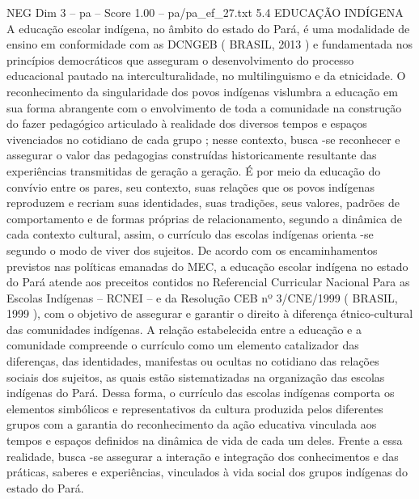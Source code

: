 \begin{textsample}{NEG Dim 3 – pa – Score 1.00 – pa/pa\_ef\_27.txt}  \label{ex:f3_neg_057}
5.4 EDUCAÇÃO INDÍGENA A educação escolar indígena, no âmbito do estado do Pará, é uma modalidade de ensino em conformidade com as DCNGEB ( BRASIL, 2013 ) e fundamentada nos princípios democráticos que asseguram o desenvolvimento do processo educacional pautado na interculturalidade, no multilinguismo e da etnicidade.
O reconhecimento da singularidade dos povos indígenas vislumbra a educação em sua forma abrangente com o envolvimento de toda a comunidade na construção do fazer pedagógico articulado à realidade dos diversos tempos e espaços vivenciados no cotidiano de cada grupo ; nesse contexto, busca -se reconhecer e assegurar o valor das pedagogias construídas historicamente resultante das experiências transmitidas de geração a geração.
É por meio da educação do convívio entre os pares, seu contexto, suas relações que os povos indígenas reproduzem e recriam suas identidades, suas tradições, seus valores, padrões de comportamento e de formas próprias de relacionamento, segundo a dinâmica de cada contexto cultural, assim, o currículo das escolas indígenas orienta -se segundo o modo de viver dos sujeitos.
De acordo com os encaminhamentos previstos nas políticas emanadas do MEC, a educação escolar indígena no estado do Pará atende aos preceitos contidos no Referencial Curricular Nacional Para as Escolas Indígenas – RCNEI – e da Resolução CEB nº 3/CNE/1999 ( BRASIL, 1999 ), com o objetivo de assegurar e garantir o direito à diferença étnico-cultural das comunidades indígenas.
A relação estabelecida entre a educação e a comunidade compreende o currículo como um elemento catalizador das diferenças, das identidades, manifestas ou ocultas no cotidiano das relações sociais dos sujeitos, as quais estão sistematizadas na organização das escolas indígenas do Pará.
Dessa forma, o currículo das escolas indígenas comporta os elementos simbólicos e representativos da cultura produzida pelos diferentes grupos com a garantia do reconhecimento da ação educativa vinculada aos tempos e espaços definidos na dinâmica de vida de cada um deles.
Frente a essa realidade, busca -se assegurar a interação e integração dos conhecimentos e das práticas, saberes e experiências, vinculados à vida social dos grupos indígenas do estado do Pará.

\end{textsample}
